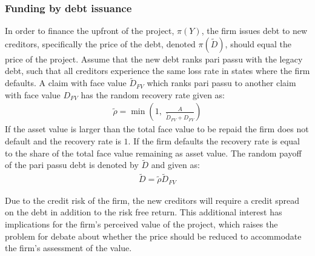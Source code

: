 \documentclass[main.tex]{subfiles}
\begin{document}
    \subsubsection{Funding by debt issuance}\label{sec:example-risk-free-project-debt-issuance}
        In order to finance the upfront of the project, $\pi(Y)$, the firm issues debt to new creditors, specifically the price of the debt, denoted $\pi(\tilde{D})$, should equal the price of the project.
        Assume that the new debt ranks pari passu with the legacy debt, such that all creditors experience the same loss rate in states where the firm defaults.
        A claim with face value $\tilde{D}_{FV}$ which ranks pari passu to another claim with face value $D_{FV}$ has the random recovery rate given as:
            \begin{align}
                \tilde{\rho} = \min\left(
                    1,\;
                    \frac{A}{\tilde{D}_{FV} + D_{FV}}
                \right)
            \end{align}
        If the asset value is larger than the total face value to be repaid the firm does not default and the recovery rate is $1$.
        If the firm defaults the recovery rate is equal to the share of the total face value remaining as asset value.
        The random payoff of the pari passu debt is denoted by $\tilde{D}$ and given as:
            \begin{align}
                \tilde{D}
                    = \tilde{\rho}\tilde{D}_{FV}
            \end{align}

        Due to the credit risk of the firm, the new creditors will require a credit spread on the debt in addition to the risk free return.
        This additional interest has implications for the firm's perceived value of the project, which raises the problem for debate about whether the price should be reduced to accommodate the firm's assessment of the value.
\end{document}
